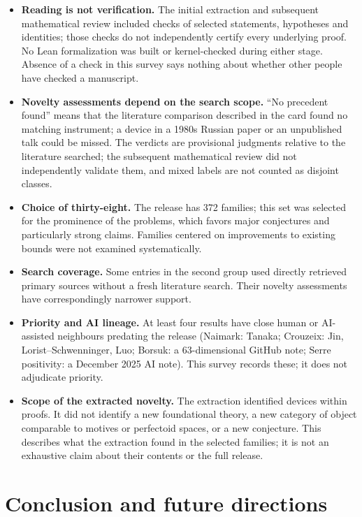 \documentclass[11pt]{article}
\begin{document}
\begin{itemize}
\item \textbf{Reading is not verification.} The initial extraction and subsequent mathematical review included checks of selected statements, hypotheses and identities; those checks do not independently certify every underlying proof. No Lean formalization was built or kernel-checked during either stage. Absence of a check in this survey says nothing about whether other people have checked a manuscript.
\item \textbf{Novelty assessments depend on the search scope.} ``No precedent found'' means that the literature comparison described in the card found no matching instrument; a device in a 1980s Russian paper or an unpublished talk could be missed. The verdicts are provisional judgments relative to the literature searched; the subsequent mathematical review did not independently validate them, and mixed labels are not counted as disjoint classes.
\item \textbf{Choice of thirty-eight.} The release has 372 families; this set was selected for the prominence of the problems, which favors major conjectures and particularly strong claims. Families centered on improvements to existing bounds were not examined systematically.
\item \textbf{Search coverage.} Some entries in the second group used directly retrieved primary sources without a fresh literature search. Their novelty assessments have correspondingly narrower support.
\item \textbf{Priority and AI lineage.} At least four results have close human or AI-assisted neighbours predating the release (Naimark: Tanaka; Crouzeix: Jin, Lorist--Schwenninger, Luo; Borsuk: a 63-dimensional GitHub note; Serre positivity: a December 2025 AI note). This survey records these; it does not adjudicate priority.
\item \textbf{Scope of the extracted novelty.} The extraction identified devices within proofs. It did not identify a new foundational theory, a new category of object comparable to motives or perfectoid spaces, or a new conjecture. This describes what the extraction found in the selected families; it is not an exhaustive claim about their contents or the full release.
\end{itemize}

\section{Conclusion and future directions}\label{sec:conclusion}
\end{document}
